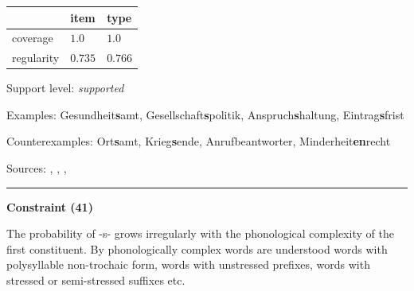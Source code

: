 \vspace{-0.25em}

\begin{table}[!ht]
\begin{center}
\setlength{\extrarowheight}{1pt}
\begin{tabularx}{\columnwidth}{|X|X|X|}
\hline
 & item & type \\
\hline
 coverage & $1.0$ & $1.0$ \\
\hline
 regularity & $0.735$ & $0.766$ \\
\hline
\end{tabularx}
\end{center}
\end{table}

\vspace{-1.35em}

\noindent
Support level: \textit{supported}

\vspace{0.3em}

\noindent
Examples: Gesundheit\textbf{s}amt, Gesellschaft\textbf{s}politik, Anspruch\textbf{s}haltung, Eintrag\textbf{s}frist

\noindent
Counterexamples: Ort\textbf{s}amt, Krieg\textbf{s}ende, Anruf{\zeroLinker}beantworter, Minderheit\textbf{en}recht

\vspace{0.3em}

\noindent
Sources: \citet[572]{fuhrhop_kuerschner_2015}, \citet[201]{kopf_2017}, \citet[106, 111, 112]{kuerschner_2005}, \citet[19, 22]{kuerschner_2010}

\vspace{0.35em}
\hrule




\vspace{0.4em}

\begin{center}
\textbf{Constraint (41)}
\end{center}

\noindent
The probability of -s- grows irregularly with the phonological complexity of the first constituent. By phonologically complex words are understood words with polysyllable non-trochaic form, words with unstressed prefixes, words with stressed or semi-stressed suffixes etc.
\vspace{0.5em}



